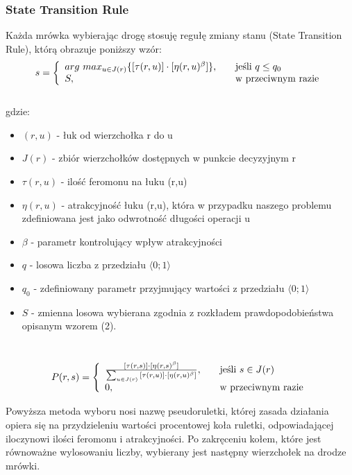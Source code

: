 \documentclass[10pt,a4paper]{article}
\begin{document}
\subsubsection{State Transition Rule}
Każda mrówka wybierając drogę stosuję regułę zmiany stanu (State Transition
Rule), którą obrazuje poniższy wzór:\\

\begin{equation}
 s = \left\{ 
  \begin{array}{l l}
    arg\ max_{u \in J(r)} \{ [\tau (r,u)] \cdot [\eta (r,u)^\beta] \} , & \quad
    \text{jeśli $q\leq q_0$}\\
    S, & \quad \text{w przeciwnym razie}
  \end{array} \right.
\end{equation} \\
gdzie:
\begin{itemize}
  \item $ (r,u) $ - łuk od wierzchołka r do u
  \item $ J(r) $ - zbiór wierzchołków dostępnych w punkcie decyzyjnym r
  \item $ \tau (r,u) $ - ilość feromonu na łuku (r,u)
  \item $ \eta (r,u) $ - atrakcyjność łuku (r,u), która w przypadku naszego
    problemu zdefiniowana jest jako odwrotność długości operacji u
  \item $ \beta $ - parametr kontrolujący wpływ atrakcyjności
  \item $ q $ - losowa liczba z przedziału $ \langle 0;1 \rangle $ 
  \item $ q_0 $ - zdefiniowany parametr przyjmujący wartości z przedziału $
    \langle 0;1 \rangle $
  \item $ S $ - zmienna losowa wybierana zgodnia z rozkładem prawdopodobieństwa
    opisanym wzorem (2). 
\end{itemize}
\\
\begin{equation}
 P(r,s) = \left\{ 
  \begin{array}{l l}
    \frac{[\tau (r,s)] \cdot [\eta (r,s)^\beta]}{\sum_{u \in J(r)} {[\tau (r,u)]
    \cdot [\eta (r,u)^\beta]}},
    & \quad \text{jeśli }s \in J(r)\\
     0, & \quad \text{w przeciwnym razie}
  \end{array} \right.
\end{equation}

Powyższa metoda wyboru nosi nazwę pseudoruletki, której zasada działania opiera
się na przydzieleniu wartości procentowej koła ruletki, odpowiadającej
iloczynowi ilości feromonu i atrakcyjności. Po zakręceniu kołem, które jest
równoważne wylosowaniu liczby, wybierany jest następny wierzchołek na drodze
mrówki.
\end{document}
